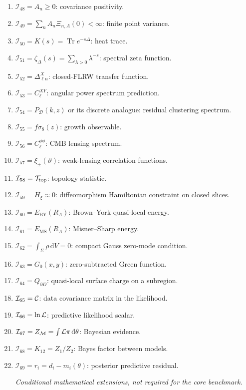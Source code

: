 \documentclass[
  aps,
  prd,
  reprint,
  superscriptaddress,
  nofootinbib,
  floatfix,
  longbibliography
]{revtex4-2}
\newcommand{\D}{\mathcal D}
\newcommand{\BY}{\mathrm{BY}}
\newcommand{\MS}{\mathrm{MS}}
\newcommand{\dd}{\mathrm d}
\newcommand{\Inv}{\mathcal I}
\begin{document}
\begin{enumerate}
\item \(\Inv_{48}=A_n\ge0\): covariance positivity.
\item \(\Inv_{49}=\sum_nA_n\Xi_{n,A}(0)<\infty\): finite point variance.
\item \(\Inv_{50}=K(s)=\operatorname{Tr}e^{-s\Delta}\): heat trace.
\item \(\Inv_{51}=\zeta_\Delta(s)=\sum_{\lambda>0}\lambda^{-s}\): spectral zeta function.
\item \(\Inv_{52}=\Delta^{X}_{\ell n}\): closed-FLRW transfer function.
\item \(\Inv_{53}=C_\ell^{XY}\): angular power spectrum prediction.
\item \(\Inv_{54}=P_\D(k,z)\) or its discrete analogue: residual clustering spectrum.
\item \(\Inv_{55}=f\sigma_8(z)\): growth observable.
\item \(\Inv_{56}=C_\ell^{\phi\phi}\): CMB lensing spectrum.
\item \(\Inv_{57}=\xi_\pm(\vartheta)\): weak-lensing correlation functions.
\item \(\Inv_{58}={\cal T}_{\rm top}\): topology statistic.
\item \(\Inv_{59}=H_\xi\approx0\): diffeomorphism Hamiltonian constraint on closed slices.
\item \(\Inv_{60}=E_{\BY}(R_A)\): Brown--York quasi-local energy.
\item \(\Inv_{61}=E_{\MS}(R_A)\): Misner--Sharp energy.
\item \(\Inv_{62}=\int_\Sigma\rho\,\dd V=0\): compact Gauss zero-mode condition.
\item \(\Inv_{63}=G_0(x,y)\): zero-subtracted Green function.
\item \(\Inv_{64}=Q_{\partial D}\): quasi-local surface charge on a subregion.
\item \(\Inv_{65}={\cal C}\): data covariance matrix in the likelihood.
\item \(\Inv_{66}=\ln{\cal L}\): predictive likelihood scalar.
\item \(\Inv_{67}=Z_{\cal M}=\int{\cal L}\pi\,\dd\theta\): Bayesian evidence.
\item \(\Inv_{68}=K_{12}=Z_1/Z_2\): Bayes factor between models.
\item \(\Inv_{69}=r_i=d_i-m_i(\theta)\): posterior predictive residual.

\smallskip
\noindent\emph{Conditional mathematical extensions, not required for
the core benchmark.}
\smallskip


\end{enumerate}
\end{document}

